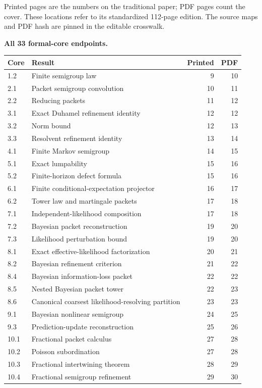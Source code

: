 Printed pages are the numbers on the traditional paper; PDF pages count the cover. These locations refer to its standardized 112-page edition. The source maps and PDF hash are pinned in the editable crosswalk.

\textbf{All 33 formal-core endpoints.}
\begin{longtable}{@{}p{.12\linewidth}p{.61\linewidth}rr@{}}\toprule Core & Result & Printed & PDF\\\midrule\endhead
1.2 & Finite semigroup law & 9 & 10\\
2.1 & Packet semigroup convolution & 10 & 11\\
2.2 & Reducing packets & 11 & 12\\
3.1 & Exact Duhamel refinement identity & 12 & 12\\
3.2 & Norm bound & 12 & 13\\
3.3 & Resolvent refinement identity & 13 & 14\\
4.1 & Finite Markov semigroup & 14 & 15\\
5.1 & Exact lumpability & 15 & 16\\
5.2 & Finite-horizon defect formula & 15 & 16\\
6.1 & Finite conditional-expectation projector & 16 & 17\\
6.2 & Tower law and martingale packets & 17 & 18\\
7.1 & Independent-likelihood composition & 17 & 18\\
7.2 & Bayesian packet reconstruction & 19 & 20\\
7.3 & Likelihood perturbation bound & 19 & 20\\
8.1 & Exact effective-likelihood factorization & 20 & 21\\
8.2 & Bayesian refinement criterion & 21 & 22\\
8.4 & Bayesian information-loss packet & 22 & 22\\
8.5 & Nested Bayesian packet tower & 22 & 23\\
8.6 & Canonical coarsest likelihood-resolving partition & 23 & 23\\
9.1 & Bayesian nonlinear semigroup & 24 & 25\\
9.3 & Prediction-update reconstruction & 25 & 26\\
10.1 & Fractional packet calculus & 27 & 28\\
10.2 & Poisson subordination & 27 & 28\\
10.3 & Fractional intertwining theorem & 28 & 29\\
10.4 & Fractional semigroup refinement & 29 & 30\\

\end{longtable}
